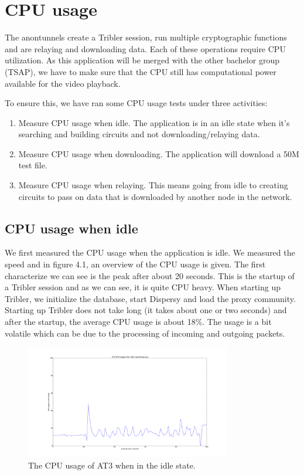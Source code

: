 \section{CPU usage}
	The anontunnels create a Tribler session, run multiple cryptographic functions and are relaying and downloading data. Each of these operations require CPU utilization. As this application will be merged with the other bachelor group (TSAP), we have to make sure that the CPU still has computational power available for the video playback.
	
	To ensure this, we have ran some CPU usage tests under three activities:
	
	\begin{enumerate}
		\item Measure CPU usage when idle. The application is in an idle state when it's searching and building circuits and not downloading/relaying data.
		\item Measure CPU usage when downloading. The application will download a 50M test file.
		\item Measure CPU usage when relaying. This means going from idle to creating circuits to pass on data that is downloaded by another node in the network.
	\end{enumerate}
	
	\subsection{CPU usage when idle}
		We first measured the CPU usage when the application is idle. We measured the speed and in figure 4.1, an overview of the CPU usage is given. The first characterize we can see is the peak after about 20 seconds. This is the startup of a Tribler session and as we can see, it is quite CPU heavy. When starting up Tribler, we initialize the database, start Dispersy and load the proxy community. Starting up Tribler does not take long (it takes about one or two seconds) and after the startup, the average CPU usage is about 18\%. The usage is a bit volatile which can be due to the processing of incoming and outgoing packets.
	
		\begin{figure}[!t]
			\centering
			\includegraphics[width=0.8\textwidth]{graphics/cpu_idle.pdf}
			\caption{The CPU usage of AT3 when in the idle state.}
			\label{fig:cpu_idle_graph}
		\end{figure}
		
